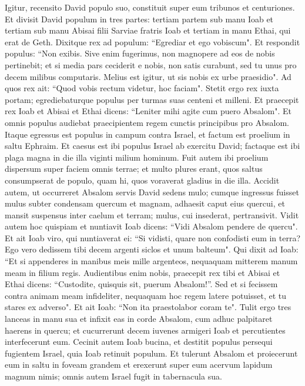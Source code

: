 \begin{biblechapter}  
\verse Igitur, recensito David populo suo, constituit super eum tribunos et centuriones. 
\verse Et divisit David populum in tres partes: tertiam partem sub manu Ioab et tertiam sub manu Abisai filii Sarviae fratris Ioab et tertiam in manu Ethai, qui erat de Geth. Dixitque rex ad populum: “Egrediar et ego vobiscum". 
\verse Et respondit populus: “Non exibis. Sive enim fugerimus, non magnopere ad eos de nobis pertinebit; et si media pars ceciderit e nobis, non satis curabunt, sed tu unus pro decem milibus computaris. Melius est igitur, ut sis nobis ex urbe praesidio". 
\verse Ad quos rex ait: “Quod vobis rectum videtur, hoc faciam". Stetit ergo rex iuxta portam; egrediebaturque populus per turmas suas centeni et milleni. 
\verse Et praecepit rex Ioab et Abisai et Ethai dicens: “Leniter mihi agite cum puero Absalom". Et omnis populus audiebat praecipientem regem cunctis principibus pro Absalom. 
\verse Itaque egressus est populus in campum contra Israel, et factum est proelium in saltu Ephraim. 
\verse Et caesus est ibi populus Israel ab exercitu David; factaque est ibi plaga magna in die illa viginti milium hominum. 
\verse Fuit autem ibi proelium dispersum super faciem omnis terrae; et multo plures erant, quos saltus consumpserat de populo, quam hi, quos voraverat gladius in die illa. 
\verse Accidit autem, ut occurreret Absalom servis David sedens mulo; cumque ingressus fuisset mulus subter condensam quercum et magnam, adhaesit caput eius quercui, et mansit suspensus inter caelum et terram; mulus, cui insederat, pertransivit. 
\verse Vidit autem hoc quispiam et nuntiavit Ioab dicens: “Vidi Absalom pendere de quercu". 
\verse Et ait Ioab viro, qui nuntiaverat ei: “Si vidisti, quare non confodisti eum in terra? Ego vero dedissem tibi decem argenti siclos et unum balteum". 
\verse Qui dixit ad Ioab: “Et si appenderes in manibus meis mille argenteos, nequaquam mitterem manum meam in filium regis. Audientibus enim nobis, praecepit rex tibi et Abisai et Ethai dicens: “Custodite, quisquis sit, puerum Absalom!”. 
\verse Sed et si fecissem contra animam meam infideliter, nequaquam hoc regem latere potuisset, et tu stares ex adverso". 
\verse Et ait Ioab: “Non ita praestolabor coram te". Tulit ergo tres lanceas in manu sua et infixit eas in corde Absalom, cum adhuc palpitaret haerens in quercu; 
\verse et cucurrerunt decem iuvenes armigeri Ioab et percutientes interfecerunt eum. 
\verse Cecinit autem Ioab bucina, et destitit populus persequi fugientem Israel, quia Ioab retinuit populum. 
\verse Et tulerunt Absalom et proiecerunt eum in saltu in foveam grandem et erexerunt super eum acervum lapidum magnum nimis; omnis autem Israel fugit in tabernacula sua. 

\end{biblechapter}
